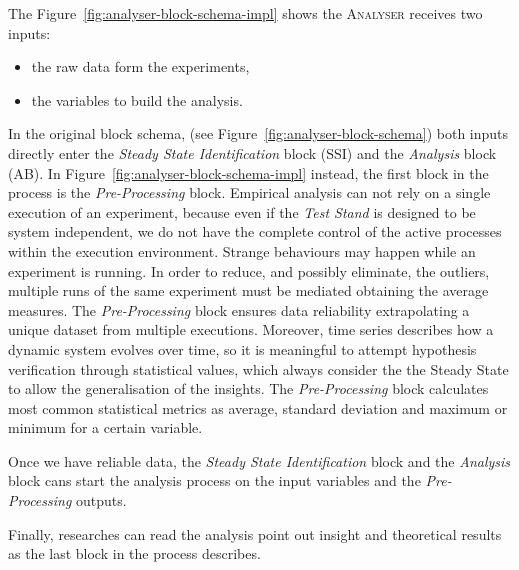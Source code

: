 The Figure~\ref{fig:analyser-block-schema-impl} shows the \textsc{Analyser} receives two inputs:
\begin{itemize}
\item the raw data form the experiments,
\item the variables to build the analysis.
\end{itemize}

In the original block schema, (see Figure~\ref{fig:analyser-block-schema}) both inputs directly enter the \textit{Steady State Identification} block (SSI) and the \textit{Analysis} block (AB). In Figure~\ref{fig:analyser-block-schema-impl} instead, the first block in the process is the \textit{Pre-Processing} block. Empirical analysis can not rely on a single execution of an experiment, because even if the \textit{Test Stand} is designed to be system independent, we do not have the complete control of the active processes within the execution environment. Strange behaviours may happen while an experiment is running. In order to reduce, and possibly eliminate, the outliers, multiple runs of the same experiment must be mediated obtaining the average measures. The \textit{Pre-Processing} block ensures data reliability extrapolating a unique dataset from multiple executions. Moreover, time series describes how a dynamic system evolves over time, so it is meaningful to attempt hypothesis verification through statistical values, which always consider the the Steady State to allow the generalisation of the insights. The \textit{Pre-Processing} block calculates most common statistical metrics as average, standard deviation and maximum or minimum for a certain variable.


Once we have reliable data, the \textit{Steady State Identification} block and the \textit{Analysis} block cans start the analysis process on the input variables and the \textit{Pre-Processing} outputs. 

Finally, researches can read the analysis point out insight and theoretical results as the last block in the process describes.


